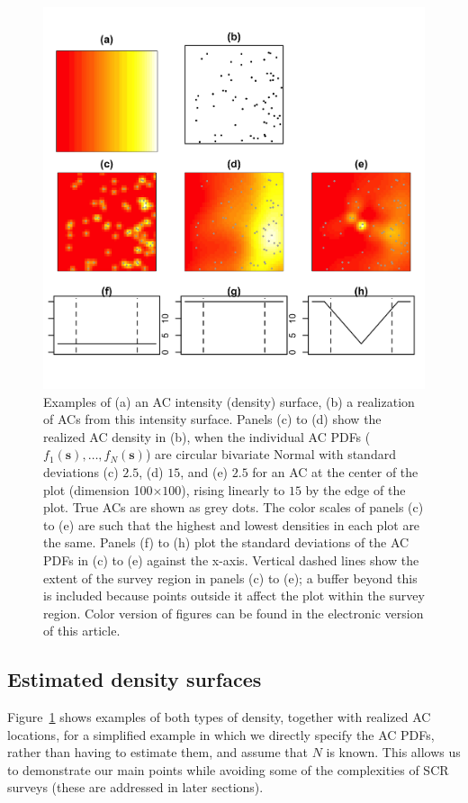\documentclass[useAMS,usenatbib,referee]{biom}
\begin{document}
\begin{figure}[htbp]
\centering
\includegraphics[width=\textwidth]{example-densities.jpg}
\caption{Examples of (a) an AC intensity (density) surface, (b) a realization of ACs from this intensity surface. Panels (c) to (d) show the realized AC density in (b), when the individual AC PDFs ($f_1(\bm{s}),\ldots,f_N(\bm{s})$) are circular bivariate Normal with standard deviations (c) $2.5$, (d) $15$, and (e) $2.5$ for an AC at the center of the plot (dimension 100$\times100$), rising linearly to $15$ by the edge of the plot. True ACs are shown as grey dots. The color scales of panels (c) to (e) are such that the highest and lowest densities in each plot are the same. Panels (f) to (h) plot the standard deviations of the AC PDFs in (c) to (e) against the x-axis. Vertical dashed lines show the extent of the survey region in panels (c) to (e); a buffer beyond this is included because points outside it affect the plot within the survey region. Color version of figures can be found in the electronic version of this article.}
\label{fig:densities}
\end{figure}

\subsection{Estimated density surfaces}
Figure~\ref{fig:densities} shows examples of both types of density, together with realized AC locations, for a simplified example in which we directly specify the AC PDFs, rather than having to estimate them, and assume that $N$ is known. This allows us to demonstrate our main points while avoiding some of the complexities of SCR surveys (these are addressed in later sections). 
\end{document}
